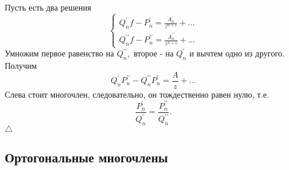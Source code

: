\documentclass[12 pt, a4 paper]{article}
\theoremstyle{plain}   \newtheorem{Pro}{Задача}
\begin{document}
Пусть есть два решения
\begin{equation*}
  \begin{cases}
    Q_n ^{\prime }f-P_n ^{\prime}=
	\frac{A_n ^{\prime}}{z^{n+1}}+...\\
	Q_n ^{\prime \prime}f-P_n ^{\prime \prime}=
	\frac{A_n ^{\prime \prime}}{z^{n+1}}+...
  \end{cases}
\end{equation*}
Умножим первое равенство на
$ Q_n ^{\prime \prime} ,$
второе - на
$ Q_n ^{\prime} $
и вычтем одно из другого. Получим
$$
  Q_n ^{\prime}P_n ^{\prime \prime}-
  Q_n ^{\prime \prime}P_n ^{\prime}=
  \frac{A}{z}+...
$$
Слева стоит многочлен, следовательно, он тождественно
равен нулю, т.е.
$$
  \frac{P_n ^{\prime}}{Q_n ^{\prime}}=
  \frac{P_n ^{\prime \prime}}
  {Q_n ^{\prime \prime}}.
$$
$ \triangle $
\newpage
\subsection{Ортогональные многочлены}
$ \; $
\\
\end{document}
